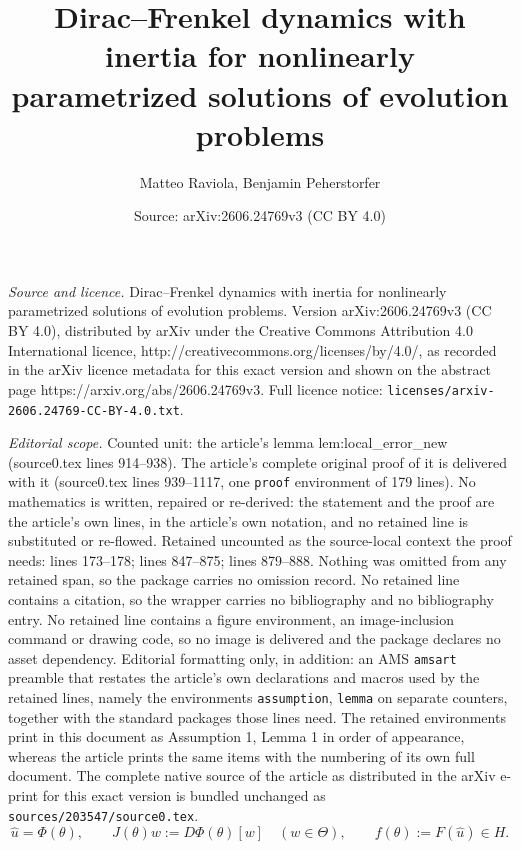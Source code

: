 \documentclass[10pt,a4paper]{amsart}
\title{Dirac--Frenkel dynamics with inertia for nonlinearly parametrized solutions of evolution problems}
\author{Matteo Raviola, Benjamin Peherstorfer}
\date{Source: arXiv:2606.24769v3 (CC BY 4.0)}
\begin{document}
\maketitle

\noindent\emph{Source and licence.} Dirac--Frenkel dynamics with inertia for nonlinearly parametrized solutions of evolution problems. Version arXiv:2606.24769v3 (CC BY 4.0), distributed by arXiv under the Creative Commons Attribution 4.0 International licence, http://creativecommons.org/licenses/by/4.0/, as recorded in the arXiv licence metadata for this exact version and shown on the abstract page https://arxiv.org/abs/2606.24769v3. Full licence notice: \texttt{licenses/arxiv-2606.24769-CC-BY-4.0.txt}.\par\smallskip

\noindent\textit{Editorial scope.} Counted unit: the article's lemma lem:local\_error\_new (source0.tex lines 914--938). The article's complete original proof of it is delivered with it (source0.tex lines 939--1117, one \texttt{proof} environment of 179 lines). No mathematics is written, repaired or re-derived: the statement and the proof are the article's own lines, in the article's own notation, and no retained line is substituted or re-flowed.  Retained uncounted as the source-local context the proof needs: lines 173--178; lines 847--875; lines 879--888.  Nothing was omitted from any retained span, so the package carries no omission record.  No retained line contains a citation, so the wrapper carries no bibliography and no bibliography entry.  No retained line contains a figure environment, an image-inclusion command or drawing code, so no image is delivered and the package declares no asset dependency.  Editorial formatting only, in addition: an AMS \texttt{amsart} preamble that restates the article's own declarations and macros used by the retained lines, namely the environments \texttt{assumption}, \texttt{lemma} on separate counters, together with the standard packages those lines need.  The retained environments print in this document as Assumption 1, Lemma 1 in order of appearance, whereas the article prints the same items with the numbering of its own full document.  The complete native source of the article as distributed in the arXiv e-print for this exact version is bundled unchanged as \texttt{sources/203547/source0.tex}.
        \begin{equation}
          \hat u=\Phi(\theta),
          \qquad J(\theta)w:=D\Phi(\theta)[w]\quad(w\in \Theta),
          \qquad f(\theta):=F(\hat u)\in H.
          \label{eq:Jf_def}
        \end{equation}
\end{document}
